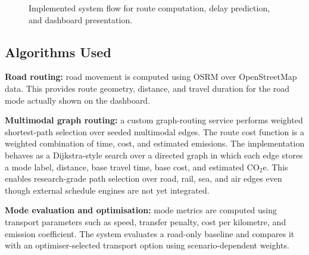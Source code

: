 \begin{figure}[htbp]
\centering
{}
\caption{Implemented system flow for route computation, delay prediction, and dashboard presentation.}
\label{fig:flow}
\end{figure}

\subsection{Algorithms Used}
\textbf{Road routing:} road movement is computed using OSRM over OpenStreetMap data. This provides route geometry, distance, and travel duration for the road mode actually shown on the dashboard.

\textbf{Multimodal graph routing:} a custom graph-routing service performs weighted shortest-path selection over seeded multimodal edges. The route cost function is a weighted combination of time, cost, and estimated emissions. The implementation behaves as a Dijkstra-style search over a directed graph in which each edge stores a mode label, distance, base travel time, base cost, and estimated \(\mathrm{CO_2e}\). This enables research-grade path selection over road, rail, sea, and air edges even though external schedule engines are not yet integrated.

\textbf{Mode evaluation and optimisation:} mode metrics are computed using transport parameters such as speed, transfer penalty, cost per kilometre, and emission coefficient. The system evaluates a road-only baseline and compares it with an optimiser-selected transport option using scenario-dependent weights.

